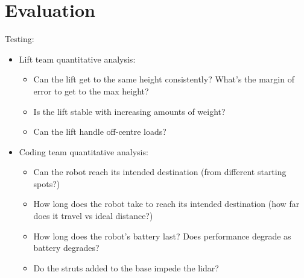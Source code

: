 \documentclass{article}
\begin{document}
\section{Evaluation}
Testing:
\begin{itemize}
\item Lift team quantitative analysis:
  \begin{itemize}
  \item Can the lift get to the same height consistently? What's the margin of error to get to the max height?
  \item Is the lift stable with increasing amounts of weight?
  \item Can the lift handle off-centre loads?
  \end{itemize}
\item Coding team quantitative analysis:
  \begin{itemize}
  \item Can the robot reach its intended destination (from different starting spots?)
  \item How long does the robot take to reach its intended destination (how far does it travel vs ideal distance?)
  \item How long does the robot's battery last? Does performance degrade as battery degrades?
  \item Do the struts added to the base impede the lidar? 
  \end{itemize}
\end{itemize}
  
\end{document}
